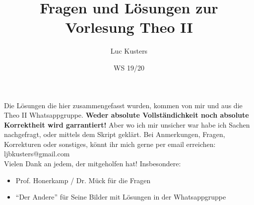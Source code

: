 \documentclass{scrartcl}
\title{Fragen und Lösungen zur Vorlesung Theo II}
\author{Luc Kusters}
\date{WS 19/20}
\begin{document}
\maketitle

\noindent
Die Lösungen die hier zusammengefasst wurden, kommen von mir und
aus die Theo II Whatsappgruppe. 
\textbf{Weder absolute Vollständichkeit noch absolute Korrektheit wird garrantiert!} Aber wo ich mir unsicher war habe ich Sachen nachgefragt, oder 
mittels dem Skript geklärt.
Bei Anmerkungen, Fragen, Korrekturen oder sonstiges, könnt ihr mich gerne 
per email erreichen:\\ 
ljbkusters@gmail.com \\

\noindent
Vielen Dank an jedem, der mitgeholfen hat! Insbesondere:
\begin{itemize}
  \item Prof. Honerkamp / Dr. Mück für die Fragen
  \item ``Der Andere'' für Seine Bilder mit Lösungen in der Whatsappgruppe
\end{itemize}

\clearpage
\newpage
\setcounter{page}{1}
\tableofcontents
\newpage
\end{document}
